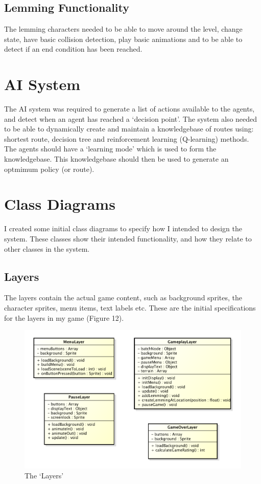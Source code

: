 \documentclass[a4paper,oneside]{report}
\begin{document}
\subsection{Lemming Functionality}

The lemming characters needed to be able to move around the level, change state, have basic collision detection, play basic animations and to be able to detect if an end condition has been reached.

\section{AI System}

The AI system was required to generate a list of actions available to the agents, and detect when an agent has reached a `decision point'. The system also needed to be able to dynamically create and maintain a knowledgebase of routes using: shortest route, decision tree and reinforcement learning (Q-learning) methods. The agents should have a `learning mode' which is used to form the knowledgebase. This knowledgebase should then be used to generate an optmimum policy (or route).

\section{Class Diagrams}

I created some initial class diagrams to specify how I intended to design the system. These classes show their intended functionality, and how they relate to other classes in the system. 

\subsection{Layers}

The layers contain the actual game content, such as background sprites, the character sprites, menu items, text labels etc. These are the initial specifications for the layers in my game (Figure 12).

\begin{figure}[h!]
  \centering
    \includegraphics[width=130mm]{sources/images/Layers}
    \caption{The `Layers'}
\end{figure}
\end{document}
